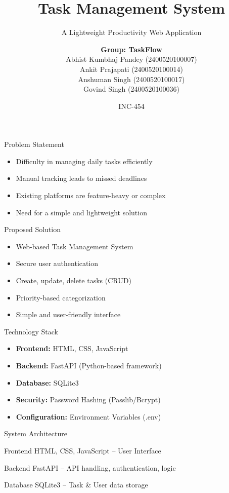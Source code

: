 \documentclass{beamer}
\title{Task Management System}
\subtitle{A Lightweight Productivity Web Application }
\author[TaskFlow]{
    \textbf{Group: TaskFlow} \\ \medskip
    Abhist Kumbhaj Pandey (2400520100007) \\
    Ankit Prajapati (2400520100014) \\
    Anshuman Singh (2400520100017) \\
    Govind Singh (2400520100036)
}
\institute[]{
    Branch: CSE-R \\
    IET Lucknow
}
\date{INC-454}
\begin{document}
\frame{\titlepage}

\begin{frame}{Problem Statement}
\begin{itemize}
    \item Difficulty in managing daily tasks efficiently
    \item Manual tracking leads to missed deadlines
    \item Existing platforms are feature-heavy or complex
    \item Need for a simple and lightweight solution
\end{itemize}
\end{frame}

\begin{frame}{Proposed Solution}
\begin{itemize}
    \item Web-based Task Management System
    \item Secure user authentication
    \item Create, update, delete tasks (CRUD)
    \item Priority-based categorization
    \item Simple and user-friendly interface
\end{itemize}
\end{frame}

\begin{frame}{Technology Stack}
\begin{itemize}
    \item \textbf{Frontend:} HTML, CSS, JavaScript
    \item \textbf{Backend:} FastAPI (Python-based framework)
    \item \textbf{Database:} SQLite3
    \item \textbf{Security:} Password Hashing (Passlib/Bcrypt)
    \item \textbf{Configuration:} Environment Variables (.env)
\end{itemize}
\end{frame}

\begin{frame}{System Architecture}

\begin{block}{Frontend}
HTML, CSS, JavaScript – User Interface
\end{block}

\begin{block}{Backend}
FastAPI – API handling, authentication, logic
\end{block}

\begin{block}{Database}
SQLite3 – Task \& User data storage
\end{block}
\end{frame}
\end{document}
